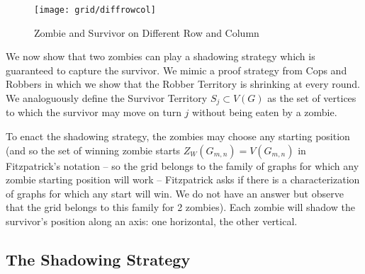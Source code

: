  \begin{figure}
   \centering
   \texttt{[image: grid/diffrowcol]}
   \caption{Zombie and Survivor on Different Row and Column\label{fig:diffrowcol}}
 \end{figure}

We now show that two zombies can play a shadowing strategy which is guaranteed to
capture the survivor. We mimic a proof strategy from Cops and Robbers in which we show
that the Robber Territory is shrinking at every round.
We analoguously define the Survivor Territory $S_j \subset V(G)$  as
the set of vertices to which the survivor may move on turn $j$ without being eaten
by a zombie.

To enact the shadowing strategy, the zombies may choose any starting position
(and so the set of winning zombie starts $Z_W(G_{m,n}) = V(G_{m,n})$ in Fitzpatrick's notation -- so the grid
belongs to the family of graphs for which any zombie starting position will work -- Fitzpatrick
asks if there is a characterization of graphs for which any start will win. We do not have an answer
but observe that the grid belongs to this family for 2 zombies).
Each zombie will shadow the survivor's position along an axis: one horizontal,
the other vertical.

\subsection{The Shadowing Strategy}


